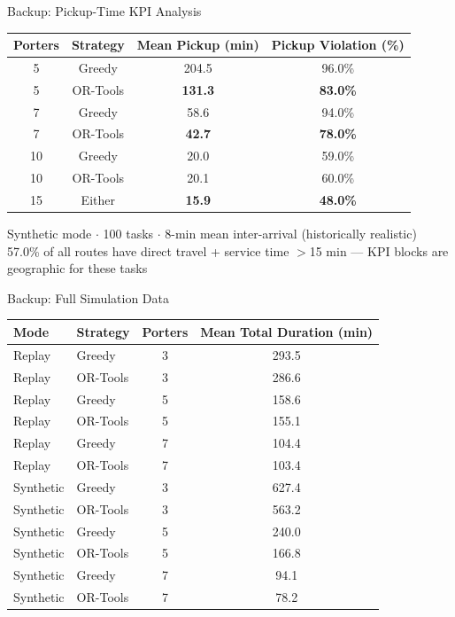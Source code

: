 \documentclass[aspectratio=169,14pt]{beamer}
\begin{document}
\begin{frame}{Backup: Pickup-Time KPI Analysis}
\centering
\footnotesize
\begin{tabular}{cccc}
\toprule
\textbf{Porters} & \textbf{Strategy} & \textbf{Mean Pickup (min)} & \textbf{Pickup Violation (\%)} \\
\midrule
5  & Greedy   & 204.5 & 96.0\% \\
5  & OR-Tools & \textbf{131.3} & \textbf{83.0\%} \\
7  & Greedy   & 58.6  & 94.0\% \\
7  & OR-Tools & \textbf{42.7}  & \textbf{78.0\%} \\
10 & Greedy   & 20.0  & 59.0\% \\
10 & OR-Tools & 20.1  & 60.0\% \\
15 & Either   & \textbf{15.9}  & \textbf{48.0\%} \\
\bottomrule
\end{tabular}

\vspace{0.4cm}
{\small Synthetic mode $\cdot$ 100 tasks $\cdot$ 8-min mean inter-arrival (historically realistic)}\\[0.2cm]
{\small 57.0\% of all routes have direct travel + service time $>$15 min --- KPI blocks are geographic for these tasks}
\end{frame}

\begin{frame}{Backup: Full Simulation Data}
\centering
\footnotesize
\begin{tabular}{llcc}
\toprule
\textbf{Mode} & \textbf{Strategy} & \textbf{Porters} & \textbf{Mean Total Duration (min)} \\
\midrule
Replay    & Greedy   & 3 & 293.5 \\
Replay    & OR-Tools & 3 & 286.6 \\
Replay    & Greedy   & 5 & 158.6 \\
Replay    & OR-Tools & 5 & 155.1 \\
Replay    & Greedy   & 7 & 104.4 \\
Replay    & OR-Tools & 7 & 103.4 \\
\midrule
Synthetic & Greedy   & 3 & 627.4 \\
Synthetic & OR-Tools & 3 & 563.2 \\
Synthetic & Greedy   & 5 & 240.0 \\
Synthetic & OR-Tools & 5 & 166.8 \\
Synthetic & Greedy   & 7 & 94.1  \\
Synthetic & OR-Tools & 7 & 78.2  \\
\bottomrule
\end{tabular}
\end{frame}
\end{document}
